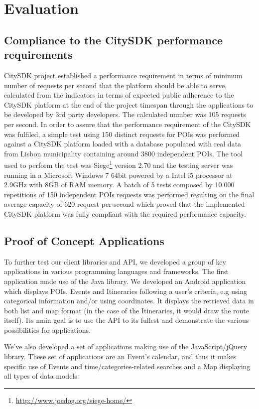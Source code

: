 \documentclass[times]{ettauth}
\begin{document}
\section{Evaluation}
\label{s:evaluation}

\subsection{Compliance to the CitySDK performance requirements}
CitySDK project established a performance requirement in terms of minimum number of requests per second that the platform should be able to serve, calculated from the indicators in terms of expected public adherence to the CitySDK platform at the end of the project timespan through the applications to be developed by 3rd party developers. 
The calculated number was 105 requests per second. 
In order to assure that the performance requirement of the CitySDK was fulfiled, a simple test using 150 distinct requests for \acp{POI} was performed against a CitySDK platform loaded with a database populated with real data from Lisbon municipality containing around 3800 independent \acp{POI}. 
The tool used to perform the test was Siege\footnote{\url{http://www.joedog.org/siege-home/}} version 2.70 and the testing server was running in a Microsoft Windows 7 64bit powered by a Intel i5 processor at 2.9GHz with 8GB of RAM memory.
A batch of 5 tests composed by 10.000 repetitions of 150 independent \acp{POI} requests was performed resulting on the final average capacity of 620 request per second which proved that the implemented CitySDK platform was fully compliant with the required performance capacity.

\subsection{Proof of Concept Applications}
To further test our client libraries and API, we developed a group of key applications in various programming languages and frameworks.
The first application made use of the Java library. 
We developed an Android application which displays \acp{POI}, Events and Itineraries following a user's criteria, e.g using categorical information and/or using coordinates. 
It displays the retrieved data in both list and map format (in the case of the Itineraries, it would draw the route itself). 
Its main goal is to use the API to its fullest and demonstrate the various possibilities for applications.

We've also developed a set of applications making use of the JavaScript/jQuery library. These set of applications are an Event's calendar, and thus it makes specific use of Events and time/categories-related searches and a Map displaying all types of data models.
\end{document}

